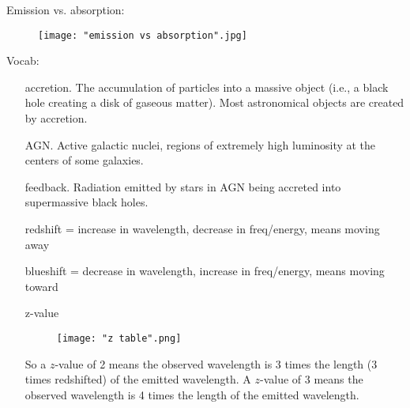 \documentclass{article}
\begin{document}
\insertTitle

\hrulefill

Emission vs. absorption:
\begin{figure}[H]
\centering
\texttt{[image: "emission vs absorption".jpg]}
\end{figure}

Vocab:
\begin{enumerate}
    \item [accretion.] The accumulation of particles into a massive object (i.e., a black hole creating a disk of gaseous matter). Most astronomical objects are created by accretion.
    \item [AGN.] Active galactic nuclei, regions of extremely high luminosity at the centers of some galaxies.
    \item [feedback.] Radiation emitted by stars in AGN being accreted into supermassive black holes.
    \item [redshift] = increase in wavelength, decrease in freq/energy, means moving away
    \item [blueshift] = decrease in wavelength, increase in freq/energy, means moving toward
    \item [z-value]
    \begin{figure}[H]
    \centering
    \texttt{[image: "z table".png]}
    \end{figure}
    So a $z$-value of 2 means the observed wavelength is 3 times the length (3 times redshifted) of the emitted wavelength. A $z$-value of 3 means the observed wavelength is 4 times the length of the emitted wavelength.
\end{enumerate}
\end{document}
